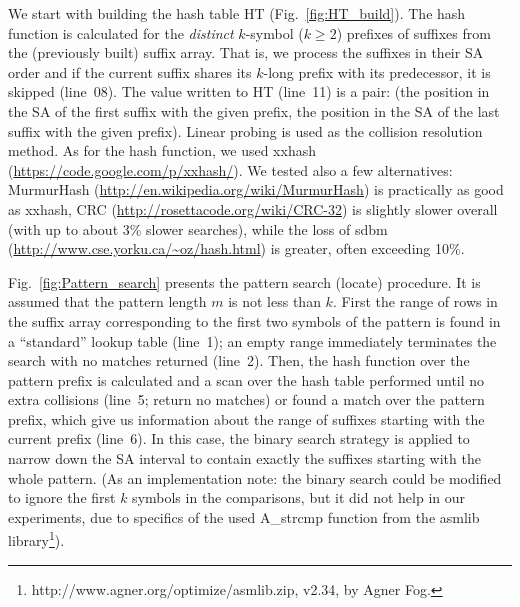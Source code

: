 \documentclass{cai}
\begin{document}
We start with building the hash table HT (Fig.~\ref{fig:HT_build}).
The hash function is calculated for the {\em distinct} $k$-symbol ($k \geq 2$) prefixes of 
suffixes from the (previously built) suffix array.
That is, we process the suffixes in their SA order and if the current suffix 
shares its $k$-long prefix with its predecessor, it is skipped (line~08).
The value written to HT (line~11) is a pair: 
(the position in the SA of the first suffix with the 
given prefix, the position in the SA of the last suffix with the given prefix).
Linear probing is used as the collision resolution method.
As for the hash function, we used 
xxhash (\url{https://code.google.com/p/xxhash/}). 
We tested also a few alternatives: MurmurHash 
(\url{http://en.wikipedia.org/wiki/MurmurHash}) is practically as good  
as xxhash, 
CRC (\url{http://rosettacode.org/wiki/CRC-32})
is slightly slower overall (with up to about 3\% slower searches), 
while the loss of sdbm (\url{http://www.cse.yorku.ca/~oz/hash.html}) 
is greater, often exceeding 10\%.

Fig.~\ref{fig:Pattern_search} presents the pattern search (locate) procedure.
It is assumed that the pattern length $m$ is not less than $k$.
First the range of rows in the suffix array corresponding to the first two 
symbols of the pattern is found in a ``standard'' lookup table (line~1); 
an empty range immediately terminates the search with no matches returned (line~2).
Then, the hash function over the pattern prefix is calculated and a scan over the 
hash table performed until no extra collisions (line~5; return no matches) 
or found a match over the pattern prefix, which give us information about the range 
of suffixes starting with the current prefix (line~6).
In this case, the binary search strategy is applied to narrow down the SA interval 
to contain exactly the suffixes starting with the whole pattern.
(As an implementation note: the binary search could be modified to ignore the first $k$ 
symbols in the comparisons, but it did not help in our experiments, 
due to specifics of the used A\_strcmp function from the asmlib library\footnote{http://www.agner.org/optimize/asmlib.zip, v2.34, by Agner Fog.}).
\end{document}
